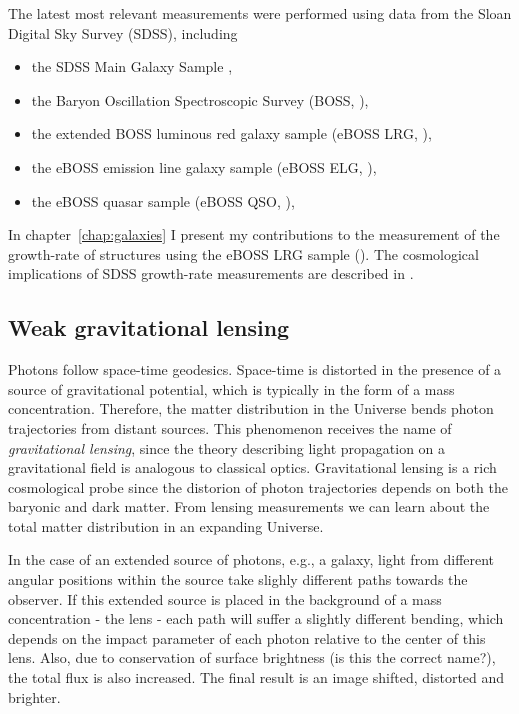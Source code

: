     The latest most relevant measurements were performed using data from 
    the Sloan Digital Sky Survey (SDSS), including 
    \begin{itemize} 
        \item the SDSS Main Galaxy Sample \cite{howlettClusteringSDSSMain2015},
        \item the Baryon Oscillation Spectroscopic Survey (BOSS, \cite{alamClusteringGalaxiesCompleted2017}), 
        \item the extended BOSS luminous red galaxy sample (eBOSS LRG, \cite{bautistaCompletedSDSSIVExtended2021, gil-marinCompletedSDSSIVExtended2020}), 
        \item the eBOSS emission line galaxy sample (eBOSS ELG, \cite{tamoneCompletedSDSSIVExtended2020, demattiaCompletedSDSSIVExtended2021}),
        \item the eBOSS quasar sample (eBOSS QSO, \cite{houCompletedSDSSIVExtended2021, neveuxCompletedSDSSIVExtended2020}),
    \end{itemize}

    In chapter~\ref{chap:galaxies} I present my contributions to the measurement 
    of the growth-rate of structures using the eBOSS LRG sample 
    (\cite{bautistaCompletedSDSSIVExtended2021}).
    The cosmological implications of SDSS growth-rate measurements are described 
    in \cite{alamCompletedSDSSIVExtended2021}. 

    \subsection{Weak gravitational lensing}
    \label{intro:probes:wl}

    Photons follow space-time geodesics. Space-time is distorted in the presence 
    of a source of gravitational potential, which is typically in the form of a mass concentration. 
    Therefore, the matter distribution in the Universe bends photon trajectories from distant sources.  
    This phenomenon receives the name of \emph{gravitational lensing}, since the 
    theory describing light propagation on a gravitational field is analogous to classical optics.  
    Gravitational lensing is a rich cosmological probe since the distorion of photon trajectories
    depends on both the baryonic and dark matter. From lensing measurements we can learn 
    about the total matter distribution in an expanding Universe. 
    
    In the case of an extended source of photons, e.g., a galaxy, light from different 
    angular positions within the source take slighly different paths towards the observer. 
    If this extended source is placed in the background of a mass concentration - the lens - each 
    path will suffer a slightly different bending, which depends on the impact parameter 
    of each photon relative to the center of this lens. 
    Also, due to conservation of surface brightness (is this the correct name?), 
    the total flux is also increased. 
    The final result is an image shifted, distorted and brighter. 

